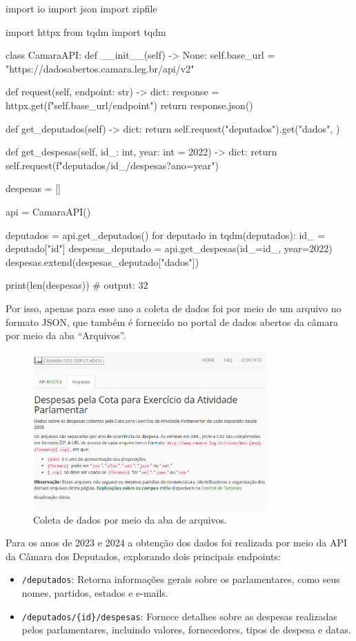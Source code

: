 \documentclass[12pt, a4paper]{article}
\begin{document}
\begin{python}
import io
import json
import zipfile

import httpx
from tqdm import tqdm

class CamaraAPI:
	def __init__(self) -> None:
		self.base_url = "https://dadosabertos.camara.leg.br/api/v2"
	
	def request(self, endpoint: str) -> dict:
		response = httpx.get(f"{self.base_url}/{endpoint}")
		return response.json()
	
	def get_deputados(self) -> dict:
		return self.request("deputados").get("dados", {})
	
	def get_despesas(self, id_: int, year: int = 2022) -> dict:
		return self.request(f"deputados/{id_}/despesas?ano={year}")

despesas = []

api = CamaraAPI()

deputados = api.get_deputados()
for deputado in tqdm(deputados):
	id_ = deputado["id"]
	despesas_deputado = api.get_despesas(id_=id_, year=2022)
	despesas.extend(despesas_deputado["dados"])

print(len(despesas))  # output: 32
\end{python}

Por isso, apenas para esse ano a coleta de dados foi por meio de um arquivo no formato JSON, que também é fornecido no portal de dados abertos da câmara por meio da aba “Arquivos”.

\begin{figure}[h]
    \centering
    \includegraphics[width=0.8\textwidth]{assets/1_arquivos.png}
    \caption{Coleta de dados por meio da aba de arquivos.}
    \label{fig:arquivo_json}
\end{figure}

Para os anos de 2023 e 2024 a obtenção dos dados foi realizada por meio da API\cite{dados_abertos} da Câmara dos Deputados, explorando dois principais endpoints:
\begin{itemize}
    \item \texttt{/deputados}: Retorna informações gerais sobre os parlamentares, como seus nomes, partidos, estados e e-mails.
    \item \texttt{/deputados/\{id\}/despesas}: Fornece detalhes sobre as despesas realizadas pelos parlamentares, incluindo valores, fornecedores, tipos de despesa e datas.
\end{itemize}
\end{document}
